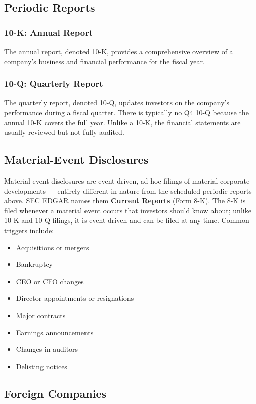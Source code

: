 \documentclass[11pt,a4paper]{report}
\begin{document}
\subsection{Periodic Reports}\label{big3}

\subsubsection{10-K: Annual Report}
The annual report, denoted 10-K, provides a comprehensive overview of a company's business and financial performance for the fiscal year.

\subsubsection{10-Q: Quarterly Report}
			
The quarterly report, denoted 10-Q, updates investors on the company's performance during a fiscal quarter. There is typically no Q4 10-Q because the annual 10-K covers the full year. Unlike a 10-K, the financial statements are usually reviewed but not fully audited.

\subsection{Material-Event Disclosures}\label{sec:edgar-material-events}

Material-event disclosures are event-driven, ad-hoc filings of material corporate developments --- entirely different in nature from the scheduled periodic reports above. SEC EDGAR names them \textbf{Current Reports} (Form 8-K). The 8-K is filed whenever a material event occurs that investors should know about; unlike 10-K and 10-Q filings, it is event-driven and can be filed at any time. Common triggers include:
\begin{itemize}
  \item Acquisitions or mergers
  \item Bankruptcy
  \item CEO or CFO changes
  \item Director appointments or resignations
  \item Major contracts
  \item Earnings announcements
  \item Changes in auditors
  \item Delisting notices
\end{itemize}


\subsection{Foreign Companies}
\end{document}
